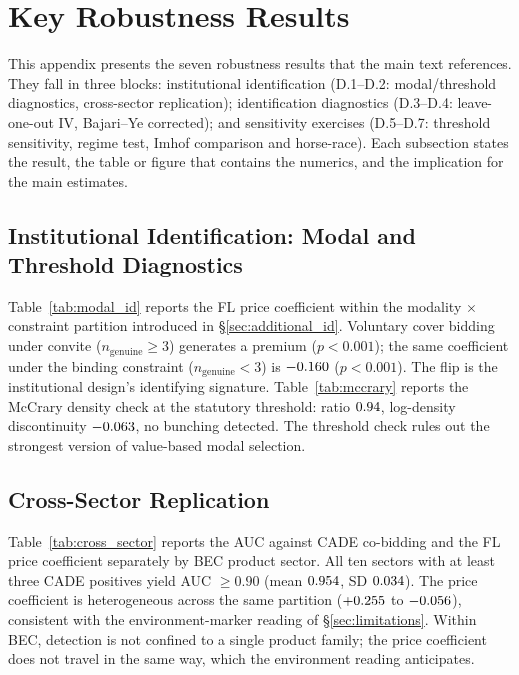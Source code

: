 



\section{Key Robustness Results}
\label{app:robustness}

This appendix presents the seven robustness results that the main
text references. They fall in three blocks: institutional
identification (D.1--D.2: modal/threshold diagnostics,
cross-sector replication); identification diagnostics
(D.3--D.4: leave-one-out IV, Bajari--Ye corrected); and
sensitivity exercises (D.5--D.7: threshold sensitivity, regime
test, Imhof comparison and horse-race). Each subsection states
the result, the table or figure that contains the numerics, and
the implication for the main estimates.

\subsection{Institutional Identification: Modal and Threshold
Diagnostics}
\label{app:robust_modal}

Table~\ref{tab:modal_id} reports the FL price coefficient
within the modality $\times$ constraint partition introduced in
\S\ref{sec:additional_id}. Voluntary cover bidding under
convite ($n_{\mathrm{genuine}} \geq 3$) generates a \valFLpremTopReg
premium ($p < 0.001$); the same coefficient under the binding
constraint ($n_{\mathrm{genuine}} < 3$) is $-0.160$
($p < 0.001$). The flip is the institutional design's
identifying signature. Table~\ref{tab:mccrary} reports the
McCrary density check at the statutory threshold: ratio
$0.94$, log-density discontinuity $-0.063$, no bunching
detected. The threshold check rules out the strongest version
of value-based modal selection.





\subsection{Cross-Sector Replication}
\label{app:cross_sector}

Table~\ref{tab:cross_sector} reports the AUC against CADE
co-bidding and the FL price coefficient separately by BEC
product sector. All ten sectors with at least three CADE
positives yield AUC $\geq 0.90$ (mean $0.954$, SD $0.034$).
The price coefficient is heterogeneous across the same partition
($+0.255$ to $-0.056$), consistent with the environment-marker
reading of \S\ref{sec:limitations}. Within BEC, detection is
not confined to a single product family; the price coefficient
does not travel in the same way, which the environment
reading anticipates.

